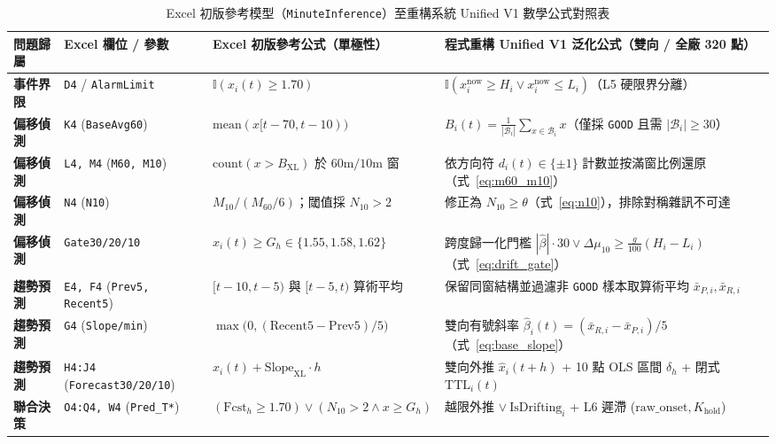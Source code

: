 \documentclass[fontset=none, a4paper, 12pt]{ctexart}
\begin{document}
\begin{doublespace}
\begin{table}[H]
\centering
\caption{Excel 初版參考模型（\texttt{MinuteInference}）至重構系統 Unified V1 數學公式對照表}
\label{tab:excel_to_program_map}
\scriptsize
\renewcommand{\arraystretch}{1.18}
\setlength{\tabcolsep}{3.5pt}
\begin{tabularx}{\textwidth}{>{\bfseries}l l X X}
\toprule
問題歸屬 & Excel 欄位 / 參數 & Excel 初版參考公式（單極性） & 程式重構 Unified V1 泛化公式（雙向 / 全廠 320 點） \\
\midrule
事件界限 & \texttt{D4} / \texttt{AlarmLimit} & $\mathbb{I}(x_i(t) \ge 1.70)$ & $\mathbb{I}(x_i^{\mathrm{now}} \ge H_i \lor x_i^{\mathrm{now}} \le L_i)$（L5 硬限界分離） \\
偏移偵測 & \texttt{K4} (\texttt{BaseAvg60}) & $\mathrm{mean}(x[t-70,t-10))$ & $B_i(t)=\frac{1}{|\mathcal{B}_i|}\sum_{x\in\mathcal{B}_i}x$（僅採 \texttt{GOOD} 且需 $|\mathcal{B}_i|\ge 30$） \\
偏移偵測 & \texttt{L4, M4} (\texttt{M60, M10}) & $\mathrm{count}(x > B_{\mathrm{XL}})$ 於 $60\mathrm{m}/10\mathrm{m}$ 窗 & 依方向符 $d_i(t)\in\{\pm 1\}$ 計數並按滿窗比例還原（式~\eqref{eq:m60_m10}） \\
偏移偵測 & \texttt{N4} (\texttt{N10}) & $M_{10}/(M_{60}/6)$；閾值採 $N_{10} > 2$ & 修正為 $N_{10} \ge \theta$（式~\eqref{eq:n10}），排除對稱雜訊不可達 \\
偏移偵測 & \texttt{Gate30/20/10} & $x_i(t) \ge G_h \in \{1.55,1.58,1.62\}$ & 跨度歸一化門檻 $|\hat{\beta}|\cdot 30 \lor \Delta\mu_{10} \ge \frac{g}{100}(H_i-L_i)$（式~\eqref{eq:drift_gate}） \\
趨勢預測 & \texttt{E4, F4} (\texttt{Prev5, Recent5}) & $[t-10,t-5)$ 與 $[t-5,t)$ 算術平均 & 保留同窗結構並過濾非 \texttt{GOOD} 樣本取算術平均 $\bar{x}_{P,i},\bar{x}_{R,i}$ \\
趨勢預測 & \texttt{G4} (\texttt{Slope/min}) & $\max\bigl(0, (\mathrm{Recent5}-\mathrm{Prev5})/5\bigr)$ & 雙向有號斜率 $\hat{\beta}_i(t) = (\bar{x}_{R,i}-\bar{x}_{P,i})/5$（式~\eqref{eq:base_slope}） \\
趨勢預測 & \texttt{H4:J4} (\texttt{Forecast30/20/10}) & $x_i(t) + \mathrm{Slope}_{\mathrm{XL}}\cdot h$ & 雙向外推 $\hat{x}_i(t+h)$ + 10 點 OLS 區間 $\delta_h$ + 閉式 $\mathrm{TTL}_i(t)$ \\
聯合決策 & \texttt{O4:Q4, W4} (\texttt{Pred\_T*}) & $(\mathrm{Fcst}_h \ge 1.70) \lor (N_{10}>2 \land x \ge G_h)$ & 越限外推 $\lor\ \mathrm{IsDrifting}_i$ + L6 遲滯 ($\mathrm{raw\_onset}, K_{\mathrm{hold}}$) \\
\bottomrule
\end{tabularx}
\end{table}


\end{doublespace}
\end{document}
